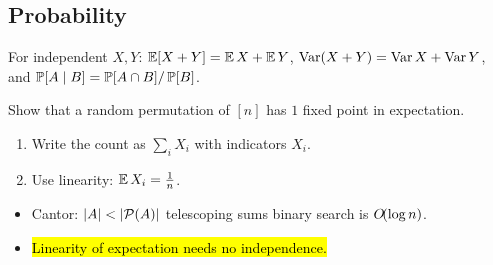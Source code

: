 \documentclass[10pt]{article}
\begin{document}
\subsection{Probability}
For independent $X, Y$: $\operatorname{\mathbb{E}}[X + Y] = \operatorname{\mathbb{E}} X + \operatorname{\mathbb{E}} Y$, $\operatorname{Var}(X + Y) = \operatorname{Var} X + \operatorname{Var} Y$, and
$\operatorname{\mathbb{P}}[A \mid B] = \operatorname{\mathbb{P}}[A \cap B] / \operatorname{\mathbb{P}}[B]$.

\begin{exercise}
  Show that a random permutation of $[n]$ has $1$ fixed point in expectation.
  \begin{enumerate}
    \item Write the count as $\sum_i X_i$ with indicators $X_i$.
    \item Use linearity: $\operatorname{\mathbb{E}} X_i = \frac1n$.
  \end{enumerate}
\end{exercise}

\begin{summary}
  \begin{itemize}
    \item Cantor: $\lvert A\rvert < \lvert\mathcal{P}(A)\rvert$ \quad\twinkle[lilac]\quad telescoping sums \quad\twinkle[lilac]\quad binary search is $\bigO{\log n}$.
    \item \hl{Linearity of expectation needs no independence.}
  \end{itemize}
\end{summary}
\end{document}
